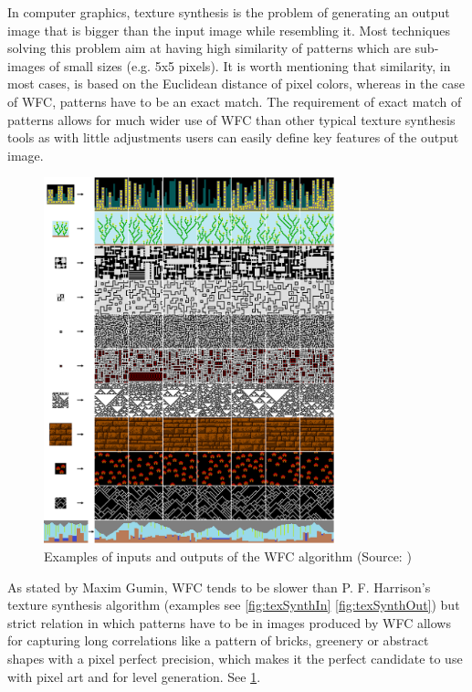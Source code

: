 \documentclass[shortabstract, english, inz]{iithesis}
\begin{document}
In computer graphics, texture synthesis is the problem of generating an output image that is bigger than the input image while resembling it. Most techniques solving this problem aim at having high similarity of patterns which are sub-images of small sizes (e.g. 5x5 pixels). It is worth mentioning that similarity, in most cases, is based on the Euclidean distance of pixel colors, whereas in the case of WFC, patterns have to be an exact match.\cite{Smith}
The requirement of exact match of patterns allows for much wider use of WFC than other typical texture synthesis tools as with little adjustments users can easily define key features of the output image. \cite{GraphBased}
\begin{figure}[H]
\centering
\includegraphics[width=0.75\textwidth, angle=0]{images/wfc.png}
\caption{Examples of inputs and outputs of the WFC algorithm (Source: \cite{MaximGumin})}
\label{fig:wfc}
\end{figure}
As stated by Maxim Gumin, WFC tends to be slower than P. F. Harrison's texture synthesis algorithm (examples see \ref{fig:texSynthIn} \ref{fig:texSynthOut}) but strict relation in which patterns have to be in images produced by WFC allows for capturing long correlations like a pattern of bricks, greenery or abstract shapes with a pixel perfect precision, which makes it the perfect candidate to use with pixel art and for level generation. See \ref{fig:wfc}.\cite{MaximGumin}
\end{document}
